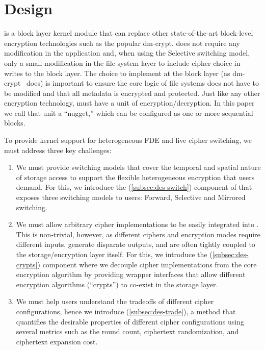 \section{\sys Design}\label{sec:des}

\sys is a block layer kernel module that can replace other state-of-the-art
block-level encryption technologies such as the popular dm-crypt. \sys does not
require any modification in the application and, when using the Selective
switching model, only a small modification in the file system layer to include
cipher choice in writes to the block layer. The choice to implement \sys at the
block layer (as dm-crypt~\cite{dmcrypt} does) is important to ensure the core
logic of file systems does not have to be modified and that all metadata is
encrypted and protected. Just like any other encryption technology, \sys must
have a unit of encryption/decryption. In this paper we call that unit a
``nugget,'' which can be configured as one or more sequential blocks.

To provide kernel support for heterogeneous FDE and live cipher switching, we
must address three key challenges:

\begin{enumerate}

\item We must provide switching models that cover the temporal and spatial
  nature of storage access to support the flexible heterogeneous encryption that
  users demand. For this, we introduce the \sysA (\cref{subsec:des-switch})
  component of \sys that exposes three switching models to users: Forward,
  Selective and Mirrored switching.

\item We must allow arbitrary cipher implementations to be easily integrated
  into \sys. This is non-trivial, however, as different ciphers and encryption
  modes require different inputs, generate disparate outputs, and are often
  tightly coupled to the storage/encryption layer itself. For this, we introduce
  the \sysB (\cref{subsec:des-crypts}) component where we decouple cipher
  implementations from the core encryption algorithm by providing wrapper
  interfaces that allow different encryption algorithms (``crypts'') to
  co-exist in the storage layer.

\item We must help users understand the tradeoffs of different cipher
  configurations, hence we introduce \sysC (\cref{subsec:des-trade}), a method
  that quantifies the desirable properties of different cipher
  configurations using several metrics such as the round count, ciphertext
  randomization, and ciphertext expansion cost.

\end{enumerate}

